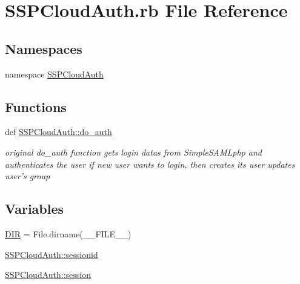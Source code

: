 \hypertarget{SSPCloudAuth_8rb}{
\section{\-S\-S\-P\-C\-l\-o\-u\-d\-A\-u\-t\-h.rb File Reference}
\label{SSPCloudAuth_8rb}
}
\subsection*{Namespaces}
\begin{DoxyCompactItemize}
\item 
\-n\-a\-m\-e\-s\-p\-a\-ce \hyperlink{namespaceSSPCloudAuth}{\-S\-S\-P\-C\-l\-o\-u\-d\-A\-u\-t\-h}
\end{DoxyCompactItemize}
\subsection*{Functions}
\begin{DoxyCompactItemize}
\item 
\-d\-e\-f \hyperlink{namespaceSSPCloudAuth_a72d4afa028a89b0c2a5cda562f2a290e}{\-S\-S\-P\-C\-l\-o\-u\-d\-A\-u\-t\-h\-:\-:\-d\-o\_\-\-a\-u\-t\-h}
\begin{DoxyCompactList}\small\item\em original \-d\-o\_\-\-a\-u\-t\-h function gets login datas from \-S\-i\-m\-p\-l\-e\-S\-A\-M\-L\-p\-h\-p and authenticates the user if new user wants to login, then creates its user updates user's group \end{DoxyCompactList}\end{DoxyCompactItemize}
\subsection*{Variables}
\begin{DoxyCompactItemize}
\item 
\hyperlink{SSPCloudAuth_8rb_a49eb6ac4643553d04b85c70646c6786d}{\-D\-I\-R} = \-F\-i\-l\-e\-.\-d\-i\-r\-n\-a\-m\-e\-(\_\-\_\-\-F\-I\-L\-E\_\-\_\-\-)
\item 
\hyperlink{namespaceSSPCloudAuth_a12c3275ac266f990e2bde03b19e5368f}{\-S\-S\-P\-C\-l\-o\-u\-d\-A\-u\-t\-h\-:\-:\-s\-e\-s\-s\-i\-o\-n\-i\-d}
\item 
\hyperlink{namespaceSSPCloudAuth_a06a8ea6415274c55ae1cd8655249f471}{\-S\-S\-P\-C\-l\-o\-u\-d\-A\-u\-t\-h\-:\-:\-s\-e\-s\-s\-i\-o\-n}
\end{DoxyCompactItemize}


